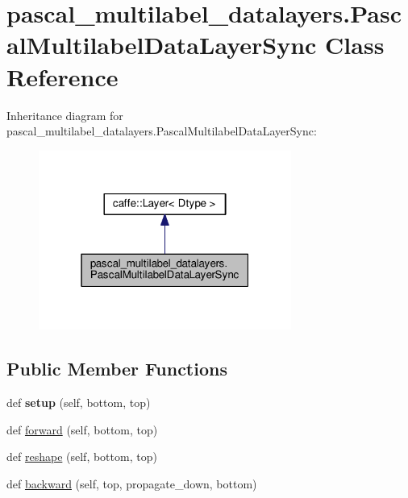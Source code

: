 \hypertarget{classpascal__multilabel__datalayers_1_1_pascal_multilabel_data_layer_sync}{}\section{pascal\+\_\+multilabel\+\_\+datalayers.\+Pascal\+Multilabel\+Data\+Layer\+Sync Class Reference}
\label{classpascal__multilabel__datalayers_1_1_pascal_multilabel_data_layer_sync}


Inheritance diagram for pascal\+\_\+multilabel\+\_\+datalayers.\+Pascal\+Multilabel\+Data\+Layer\+Sync\+:
\nopagebreak
\begin{figure}[H]
\begin{center}
\leavevmode
\includegraphics[width=235pt]{classpascal__multilabel__datalayers_1_1_pascal_multilabel_data_layer_sync__inherit__graph}
\end{center}
\end{figure}
\subsection*{Public Member Functions}
\begin{DoxyCompactItemize}
\item 
\mbox{\label{classpascal__multilabel__datalayers_1_1_pascal_multilabel_data_layer_sync_ad59e2548e57842d92e33df480f0973fd}} 
def {\bfseries setup} (self, bottom, top)
\item 
def \mbox{\hyperlink{classpascal__multilabel__datalayers_1_1_pascal_multilabel_data_layer_sync_a503c3a39b8b45f9cf0c04bf30d9040da}{forward}} (self, bottom, top)
\item 
def \mbox{\hyperlink{classpascal__multilabel__datalayers_1_1_pascal_multilabel_data_layer_sync_a07b5a24aa7fda972baf00e01ca4e1767}{reshape}} (self, bottom, top)
\item 
def \mbox{\hyperlink{classpascal__multilabel__datalayers_1_1_pascal_multilabel_data_layer_sync_a6699de191eb1b3a6b4f5cb6f60ea5250}{backward}} (self, top, propagate\+\_\+down, bottom)
\end{DoxyCompactItemize}

